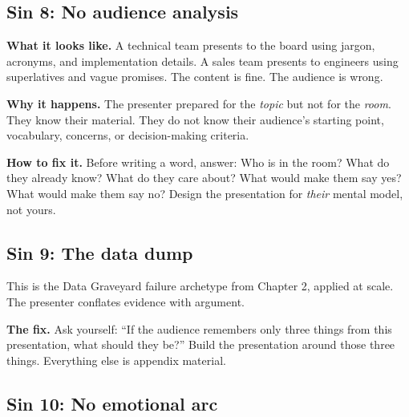 
\subsection{Sin 8: No audience analysis}

\textbf{What it looks like.} A technical team presents to the board using jargon, acronyms, and implementation details. A sales team presents to engineers using superlatives and vague promises. The content is fine. The audience is wrong.

\textbf{Why it happens.} The presenter prepared for the \emph{topic} but not for the \emph{room}. They know their material. They do not know their audience's starting point, vocabulary, concerns, or decision-making criteria.

\textbf{How to fix it.} Before writing a word, answer: Who is in the room? What do they already know? What do they care about? What would make them say yes? What would make them say no? Design the presentation for \emph{their} mental model, not yours.


\subsection{Sin 9: The data dump}

This is the Data Graveyard failure archetype from Chapter 2, applied at scale. The presenter conflates evidence with argument.

\textbf{The fix.} Ask yourself: ``If the audience remembers only three things from this presentation, what should they be?'' Build the presentation around those three things. Everything else is appendix material.


\subsection{Sin 10: No emotional arc}


